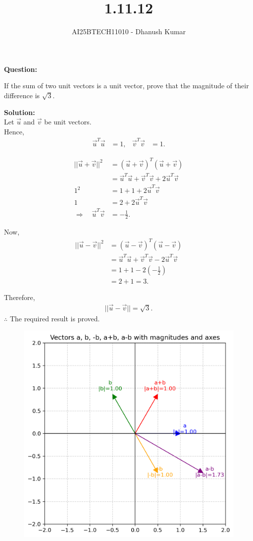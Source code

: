 \documentclass[journal]{IEEEtran}
\begin{document}
\title{1.11.12}
\author{AI25BTECH11010 - Dhanush Kumar}
\maketitle
\renewcommand{\thefigure}{\theenumi}
\renewcommand{\thetable}{\theenumi}

\noindent
\noindent\textbf{Question:} 

If the sum of two unit vectors is a unit vector, prove that the magnitude of their difference is $\sqrt{3}$.

\bigskip
\noindent\textbf{Solution:} \\


Let 
	$\vec{u}$ and $\vec{v}$ be unit vectors.\\
	Hence,
\begin{align}
	\vec{u}^T \vec{u} &= 1, & \vec{v}^T \vec{v} &= 1.
\end{align}

\medskip

\begin{align}
||\vec{u}+\vec{v}||^2 &= (\vec{u}+\vec{v})^T(\vec{u}+\vec{v}) \\
&= \vec{u}^T\vec{u} + \vec{v}^T\vec{v} + 2\vec{u}^T\vec{v} \\
1^2 &= 1 + 1 + 2\vec{u}^T\vec{v} \\
1 &= 2 + 2\vec{u}^T\vec{v} \\
\Rightarrow \quad \vec{u}^T\vec{v} &= -\tfrac{1}{2}.
\end{align}

\medskip

Now,  
\begin{align}
||\vec{u}-\vec{v}||^2 &= (\vec{u}-\vec{v})^T(\vec{u}-\vec{v}) \\
&= \vec{u}^T\vec{u} + \vec{v}^T\vec{v} - 2\vec{u}^T\vec{v} \\
&= 1 + 1 - 2\left(-\tfrac{1}{2}\right) \\
&= 2 + 1 = 3.
\end{align}

Therefore,  
\begin{align}
||\vec{u}-\vec{v}|| = \sqrt{3}.
\end{align}
\noindent\(\therefore\) The required result is proved.
\begin{figure}[H]
  \centering
   \includegraphics[width=0.7\linewidth]{../figs/vectors_plot.png}
   \caption{}
  \label{stemplot}
\end{figure}
\end{document}
